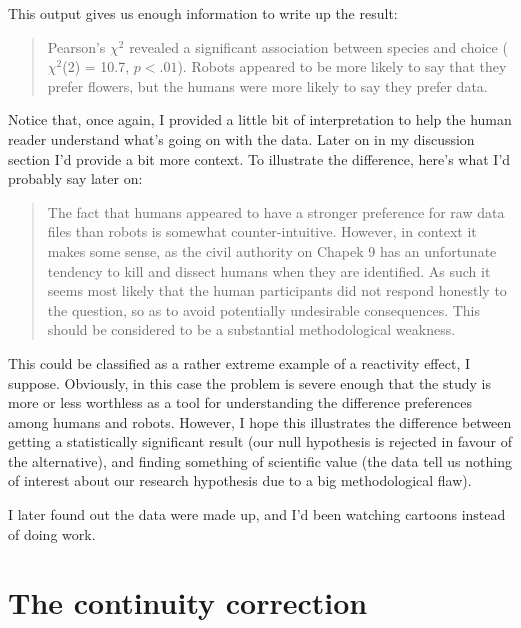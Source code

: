 This output gives us enough information to write up the result:
\begin{quote}
Pearson's $\chi^2$ revealed a significant association between species and choice ($\chi^2$(2) = 10.7, $p < .01$). Robots appeared to be more likely to say that they prefer flowers, but the humans were more likely to say they prefer data.
\end{quote}
Notice that, once again, I provided a little bit of interpretation to help the human reader understand what's going on with the data. Later on in my discussion section I'd provide a bit more context. To illustrate the difference, here's what I'd probably say later on:
\begin{quote}
The fact that humans appeared to have a stronger preference for raw data files than robots is somewhat counter-intuitive. However, in context it makes some sense, as the civil authority on Chapek 9 has an unfortunate tendency to kill and dissect humans when they are identified. As such it seems most likely that the human participants did not respond honestly to the question, so as to avoid potentially undesirable consequences. This should be considered to be a substantial methodological weakness.
\end{quote}
This could be classified as a rather extreme example of a reactivity effect, I suppose. Obviously, in this case the problem is severe enough that the study is more or less worthless as a tool for understanding the difference preferences among humans and robots. However, I hope this illustrates the difference between getting a statistically significant result (our null hypothesis is rejected in favour of the alternative), and finding something of scientific value (the data tell us nothing of interest about our research hypothesis due to a big methodological flaw).



I later found out the data were made up, and I'd been watching cartoons instead of doing work.
\vspace*{12pt}


\section{The continuity correction~\label{sec:yates}}

